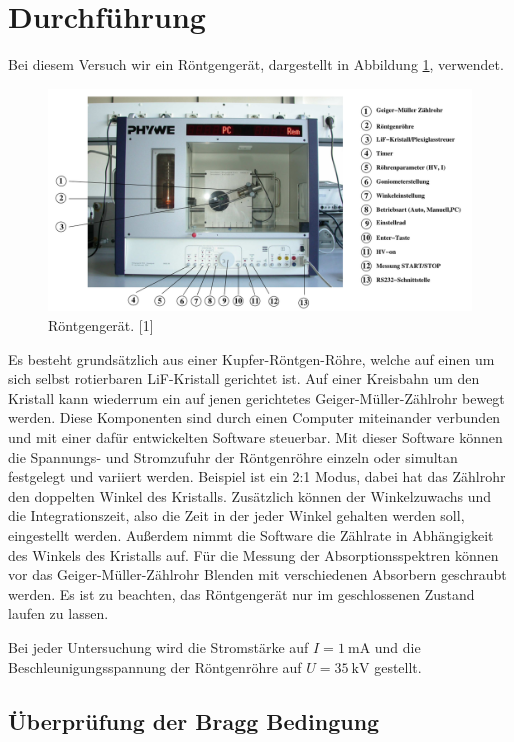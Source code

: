 \section{Durchführung}
\label{sec:Durchführung}

Bei diesem Versuch wir ein Röntgengerät, dargestellt in Abbildung 
\ref{fig:Aufbau}, verwendet. 

\begin{figure}
\centering
\includegraphics[scale=0.5]{content/aufbau1.png}
\caption{Röntgengerät. [1]}
\label{fig:Aufbau}
\end{figure}

Es besteht grundsätzlich aus einer Kupfer-Röntgen-Röhre, welche auf einen 
um sich selbst rotierbaren LiF-Kristall gerichtet ist. Auf einer Kreisbahn 
um den Kristall kann wiederrum ein auf jenen gerichtetes Geiger-Müller-Zählrohr
bewegt werden.
Diese Komponenten sind durch einen Computer miteinander verbunden und mit einer
dafür entwickelten Software steuerbar. Mit dieser Software können die Spannungs-
und Stromzufuhr der Röntgenröhre einzeln oder simultan festgelegt und variiert 
werden. Beispiel ist ein 2:1 Modus, dabei hat das Zählrohr den doppelten 
Winkel des Kristalls.
Zusätzlich können der Winkelzuwachs und die Integrationszeit, also die Zeit in der 
jeder Winkel gehalten werden soll, eingestellt werden. 
Außerdem nimmt die Software die Zählrate in Abhängigkeit des Winkels des Kristalls 
auf. Für die Messung der Absorptionsspektren können vor das Geiger-Müller-Zählrohr
Blenden mit verschiedenen Absorbern geschraubt werden. 
Es ist zu beachten, das Röntgengerät nur im geschlossenen Zustand laufen zu lassen. 

Bei jeder Untersuchung wird die Stromstärke auf $I = \SI{1}{\milli\ampere}$ und die 
Beschleunigungsspannung der Röntgenröhre auf $U = \SI{35}{\kilo\volt}$ gestellt. 

\subsection{Überprüfung der Bragg Bedingung}


